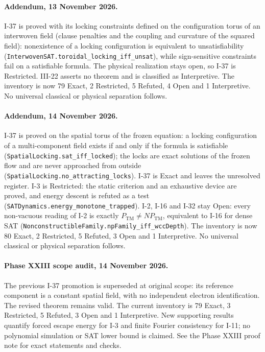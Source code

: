 \documentclass[11pt]{article}
\begin{document}
\paragraph{Addendum, 13 November 2026.}
I-37 is proved with its locking constraints defined on the
configuration torus of an interwoven field (clause penalties and the
coupling and curvature of the squared field): nonexistence of a locking
configuration is equivalent to unsatisfiability
(\nolinkurl{InterwovenSAT.toroidal_locking_iff_unsat}), while
sign-sensitive constraints fail on a satisfiable formula.  The physical
realization stays open, so I-37 is Restricted.  III-22 asserts no
theorem and is classified as Interpretive.  The inventory is now
79 Exact, 2 Restricted, 5 Refuted, 4 Open and 1 Interpretive.  No
universal classical or physical separation follows.

\paragraph{Addendum, 14 November 2026.}
I-37 is proved on the spatial torus of the frozen equation: a locking
configuration of a multi-component field exists if and only if the
formula is satisfiable (\nolinkurl{SpatialLocking.sat_iff_locked}); the
locks are exact solutions of the frozen flow and are never approached
from outside (\nolinkurl{SpatialLocking.no_attracting_locks}).  I-37 is
Exact and leaves the unresolved register.  I-3 is Restricted: the static
criterion and an exhaustive device are proved, and energy descent is
refuted as a test (\nolinkurl{SATDynamics.energy_monotone_trapped}).
I-2, I-16 and I-32 stay Open: every non-vacuous reading of I-2 is
exactly $P_{\mathrm{TM}}\neq NP_{\mathrm{TM}}$, equivalent to I-16 for
dense SAT (\nolinkurl{NonconstructibleFamily.npFamily_iff_wccDepth}).
The inventory is now 80 Exact, 2 Restricted, 5 Refuted, 3 Open and
1 Interpretive.  No universal classical or physical separation follows.

\paragraph{Phase XXIII scope audit, 14 November 2026.}
The previous I-37 promotion is superseded at original scope: its reference
component is a constant spatial field, with no independent electron
identification. The revised theorem remains valid. The current inventory is
79 Exact, 3 Restricted, 5 Refuted, 3 Open and 1 Interpretive.
New supporting results quantify forced escape energy for I-3 and finite
Fourier consistency for I-11; no polynomial simulation or SAT lower bound
is claimed. See the Phase XXIII proof note for exact statements and checks.
\end{document}
